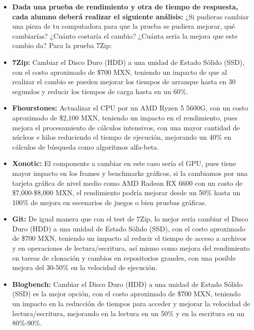 \documentclass[12pt]{article}
\begin{document}
\begin{enumerate}[label=(\arabic{section}.\arabic{subsection}.\arabic{enumi})]
    \begin{itemize}
    	\item \textbf{Dada una prueba de rendimiento y otra de tiempo de respuesta, cada alumno deberá realizar el siguiente análisis:} ¿Si pudieras cambiar una pieza de tu computadora para que la prueba se pudiera mejorar, qué cambiarías? ¿Cuánto costaría el cambio? ¿Cuánta sería la mejora que este cambio da? Para la prueba 7Zip:
    	
    	\item \textbf{7Zip:} Cambiar el Disco Duro (HDD) a una unidad de Estado Sólido (SSD), con el costo aproximado de \$700 MXN, teniendo un impacto de que al realizar el cambio se pueden mejorar los tiempos de arranque hasta en 30 segundos y reducir los tiempos de carga hasta en un 60\%.
    	
    	\item \textbf{Fhourstones:} Actualizar el CPU por un AMD Ryzen 5 5600G, con un costo aproximado de \$2,100 MXN, teniendo un impacto en el rendimiento, pues mejora el procesamiento de cálculos intensivos, con una mayor cantidad de núcleos e hilos reduciendo el tiempo de ejecución, mejorando un 40\% en cálculos de búsqueda como algoritmos alfa-beta.
    	
    	\item \textbf{Xonotic:} El componente a cambiar en este caso sería el GPU, pues tiene mayor impacto en los frames y benchmarks gráficos, si la cambiamos por una tarjeta gráfica de nivel medio como AMD Radeon RX 6600 con un costo de \$7,000-\$8,000 MXN, el rendimiento podría mejorar desde un 50\% hasta un 100\% de mejora en escenarios de juegos o bien pruebas gráficas.
    	
    	\item \textbf{Git:} De igual manera que con el test de 7Zip, lo mejor sería cambiar el Disco Duro (HDD) a una unidad de Estado Sólido (SSD), con el costo aproximado de \$700 MXN, teniendo un impacto al reducir el tiempo de acceso a archivos y en operaciones de lectura/escritura, así mismo como mejora del rendimiento en tareas de clonación y cambios en repositorios grandes, con una posible mejora del 30-50\% en la velocidad de ejecución.
    	
    	\item \textbf{Blogbench:} Cambiar el Disco Duro (HDD) a una unidad de Estado Sólido (SSD) es la mejor opción, con el costo aproximado de \$700 MXN, teniendo un impacto en la reducción de tiempos para acceder y mejorar la velocidad de lectura/escritura, mejorando en la lectura en un 50\% y en la escritura en un 80\%-90\%.
    	

\end{itemize}
\end{enumerate}
\end{document}
